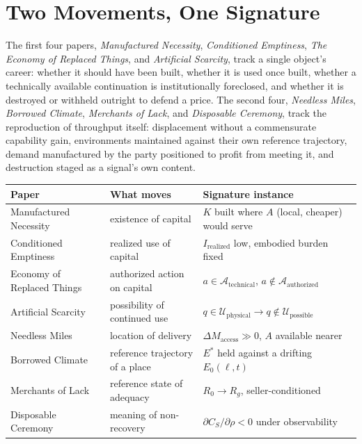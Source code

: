 \documentclass[11pt]{article}
\begin{document}
\section{Two Movements, One Signature}

The first four papers, \emph{Manufactured Necessity}, \emph{Conditioned Emptiness}, \emph{The Economy of Replaced Things}, and \emph{Artificial Scarcity}, track a single object's career: whether it should have been built, whether it is used once built, whether a technically available continuation is institutionally foreclosed, and whether it is destroyed or withheld outright to defend a price. The second four, \emph{Needless Miles}, \emph{Borrowed Climate}, \emph{Merchants of Lack}, and \emph{Disposable Ceremony}, track the reproduction of throughput itself: displacement without a commensurate capability gain, environments maintained against their own reference trajectory, demand manufactured by the party positioned to profit from meeting it, and destruction staged as a signal's own content.

\begin{center}
\begin{tabular}{@{}p{3.1cm}p{4.6cm}p{4.6cm}@{}}
\toprule
Paper & What moves & Signature instance \\
\midrule
Manufactured Necessity & existence of capital & $K$ built where $A$ (local, cheaper) would serve \\
Conditioned Emptiness & realized use of capital & $I_{\text{realized}}$ low, embodied burden fixed \\
Economy of Replaced Things & authorized action on capital & $a \in \mathcal{A}_{\text{technical}}$, $a \notin \mathcal{A}_{\text{authorized}}$ \\
Artificial Scarcity & possibility of continued use & $q \in \mathcal{U}_{\text{physical}} \to q \notin \mathcal{U}_{\text{possible}}$ \\
Needless Miles & location of delivery & $\Delta M_{\text{access}} \gg 0$, $A$ available nearer \\
Borrowed Climate & reference trajectory of a place & $E^{*}$ held against a drifting $E_0(\ell,t)$ \\
Merchants of Lack & reference state of adequacy & $R_0 \to R_g$, seller-conditioned \\
Disposable Ceremony & meaning of non-recovery & $\partial C_S/\partial\rho < 0$ under observability \\
\bottomrule
\end{tabular}
\end{center}
\end{document}
